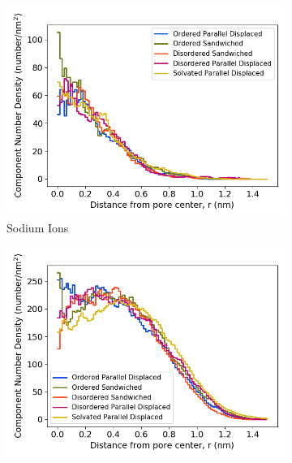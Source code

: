 \documentclass[journal=jpcbfk,manuscript=article]{achemso}
\begin{document}
  \begin{figure}[!htb]
  \centering
  \begin{subfigure}{0.32\textwidth}
        \includegraphics[width=1\linewidth]{sodium_density.png}
        \caption{Sodium Ions}
        \label{fig:sodium_regional_density}
  \end{subfigure}
  \begin{subfigure}{0.32\textwidth}
        \includegraphics[width=1\linewidth]{head_group_density.png}

\end{subfigure}
\end{figure}
\end{document}
